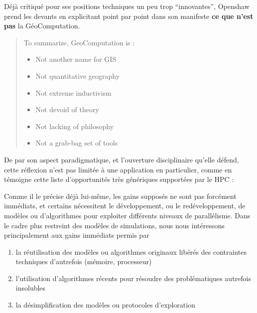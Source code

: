 Déjà critiqué pour ses positions techniques un peu trop \enquote{innovantes}, Openshaw prend les devants en explicitant point par point dans son manifeste \textbf{ce que n'est pas} la GéoComputation.

\foreignblockquote{english}[{\cite[11]{Openshaw2000}}]{To summarize, GeoComputation is :
\begin{itemize}
\item Not another name for GIS
\item Not quantitative geography
\item Not extreme inductivism
\item Not devoid of theory
\item Not lacking of philosophy
\item Not a grab-bag set of tools
\end{itemize}}

De par son aspect paradigmatique, et l'ouverture disciplinaire qu'elle défend, cette réflexion n'est pas limitée à une application en particulier, comme en témoigne cette liste d'opportunités très génériques supportées par le HPC :


Comme il le précise déjà lui-même, les gains supposés ne sont pas forcément immédiats, et certains nécessitent le développement, ou le redéveloppement, de modèles ou d'algorithmes pour exploiter différents niveaux de parallélisme. Dans le cadre plus restreint des modèles de simulations, nous nous intéressons principalement aux gains immédiats permis par \begin{enumerate}[label=(\alph*)]  \item la réutilisation des modèles ou algorithmes originaux libérés des contraintes techniques d'autrefois (mémoire, processeur)  \item l'utilisation d'algorithmes récents pour résoudre des problématiques autrefois insolubles \item la désimplification des modèles ou protocoles d'exploration \end{enumerate}

